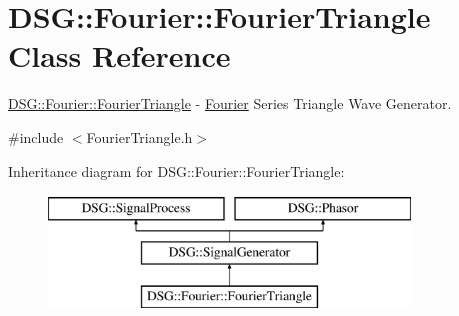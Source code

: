 \hypertarget{class_d_s_g_1_1_fourier_1_1_fourier_triangle}{\section{D\+S\+G\+:\+:Fourier\+:\+:Fourier\+Triangle Class Reference}
\label{class_d_s_g_1_1_fourier_1_1_fourier_triangle}
}


\hyperlink{class_d_s_g_1_1_fourier_1_1_fourier_triangle}{D\+S\+G\+::\+Fourier\+::\+Fourier\+Triangle} -\/ \hyperlink{namespace_d_s_g_1_1_fourier}{Fourier} Series Triangle Wave Generator.  




{\ttfamily \#include $<$Fourier\+Triangle.\+h$>$}

Inheritance diagram for D\+S\+G\+:\+:Fourier\+:\+:Fourier\+Triangle\+:\begin{figure}[H]
\begin{center}
\leavevmode
\includegraphics[height=3.000000cm]{class_d_s_g_1_1_fourier_1_1_fourier_triangle}
\end{center}
\end{figure}
